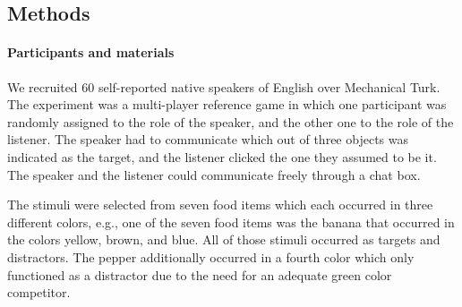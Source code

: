 \documentclass[10pt,letterpaper]{article}
\begin{document}
\subsection{Methods}

\paragraph{Participants and materials}
We recruited 60 self-reported native speakers of English over Mechanical Turk. The experiment was a multi-player reference game in which one participant was randomly assigned to the role of the speaker, and the other one to the role of the listener. The speaker had to communicate which out of three objects was indicated as the target, and the listener clicked the one they assumed to be it. The speaker and the listener could communicate freely through a chat box.

The stimuli were selected from seven food items which each occurred in three different colors, e.g., one of the seven food items was the banana that occurred in the colors yellow, brown, and blue. All of those stimuli occurred as targets and distractors. The pepper additionally occurred in a fourth color which only functioned as a distractor due to the need for an adequate green color competitor.
\end{document}
